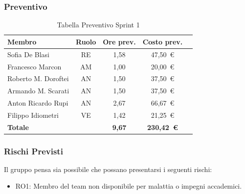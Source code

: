 \subsubsection{Preventivo}
\begin{table}[H]
    \centering
    \renewcommand{\arraystretch}{1.3}
    \begin{tabularx}{\textwidth}{|X|c|c|c|r|}
        \hline
        \textbf{Membro} & \textbf{Ruolo} & \textbf{Ore prev.} & \textbf{Costo prev.} \\
        \hline
        Sofia De Blasi           & RE & 1,58  & 47{,}50~\euro \\
        Francesco Marcon         & AM & 1,00  & 20{,}00~\euro \\
        Roberto M. Doroftei      & AN & 1,50  & 37{,}50~\euro \\
        Armando M. Scarati     & AN & 1,50  & 37{,}50~\euro \\
        Anton Ricardo Rupi       & AN & 2,67  & 66{,}67~\euro \\
        Filippo Idiometri        & VE & 1,42  & 21{,}25~\euro \\
        \hline
        \textbf{Totale}          &    & \textbf{9,67} &
        \textbf{230{,}42~\euro} \\
        \hline
    \end{tabularx}
    \caption{Tabella Preventivo Sprint 1} 
\end{table}

\subsubsection{Rischi Previsti}
Il gruppo pensa sia possibile che possano presentarsi i seguenti rischi:
\begin{itemize}
    \item RO1: Membro del team non disponibile per malattia o impegni accademici.
\end{itemize}

